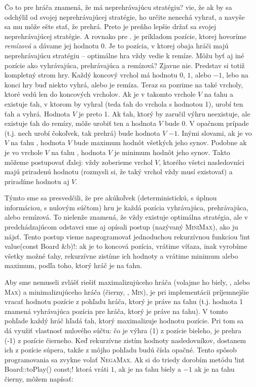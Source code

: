 Čo to pre hráča \crossinl znamená, že \noughtinl má neprehrávajúcu stratégiu?
\crossinl vie, že ak by sa odchýlil od svojej neprehrávajúcej stratégie, \noughtinl 
ho určite nenechá vyhrať, a navyše sa mu môže ešte stať, že prehrá. Preto je preňho lepšie
držať sa svojej neprehrávajúcej stratégie. A rovnako pre \noughtinl. 
je príkladom pozície, ktorej hovoríme {\em remízová} a dávame jej hodnotu 0. Je to pozícia,
v ktorej obaja hráči majú neprehrávajúcu stratégiu -- optimálne hra vždy vedie k remíze.
Môžu byť aj iné pozície ako vyhrávajúca, prehrávajúca a remízová? 
Zjavne nie. Predstav si totiž kompletný strom hry. Každý koncový vrchol má hodnotu $0$, $1$, alebo $-1$,
lebo na konci hry buď niekto vyhrá, alebo je remíza. Teraz sa pozrime na také vrcholy, 
ktoré vedú len do koncových vrcholov. Ak je v takomto vrchole $V$ na ťahu \crossinl a existuje
ťah, v ktorom by vyhral (teda ťah do vrchola s hodnotou 1), \crossinl urobí ten ťah a vyhrá.
Hodnota $V$ je preto 1. Ak ťah, ktorý by \crossinl zaručil výhru neexistuje, ale existuje
ťah do remízy, \crossinl môže urobiť ten a hodnota $V$ bude 0. V opačnom prípade (t.j. nech \crossinl
urobí čokoľvek, tak prehrá) bude hodnota $V$ $-1$. Inými slovami, ak je vo $V$ na ťahu \crossinl,
hodnota $V$ bude maximum hodnôt všetkých jeho synov. Podobne ak je vo vrchole $V$ na ťahu \noughtinl,
hodnota $V$ je minimum hodnôt jeho synov. Takto môžeme postupovať ďalej: vždy zoberieme vrchol $V$,
ktorého všetci nasledovníci majú priradenú hodnotu (rozmysli si, že taký vrchol vždy musí existovať) 
a priradíme hodnotu aj $V$. 

 
Týmto sme sa presvedčili, že pre akúkoľvek (deterministickú, s úplnou informáciou, s nulovým súčtom) 
hru je každá pozícia vyhrávajúca, prehrávajúca, alebo remízová. To nielenže znamená, 
že vždy existuje optimálna
stratégia, ale v predchádzajúcom odstavci sme aj opísali postup (nazývaný {\scshape MiniMax}), ako
ju nájsť. Tento postup vieme naprogramovať jednoduchou rekurzívnou funkciou \prg!int value(const Board &b)!:
ak je to koncová pozícia, vrátime víťaza, inak vyrobíme všetky možné ťahy, rekurzívne zistíme ich hodnoty a
vrátime minimum alebo maximum, podľa toho, ktorý hráč je na ťahu.

Aby sme nemuseli
zvlášť riešiť maximalizujúceho hráča (volajme ho biely, \crossinl, alebo {\scshape Max}) a minimalizujúceho
hráča (čierny, \noughtinl, {\scshape Min}), je pri implementácii príjemnejšie vracať hodnotu pozície z pohľadu hráča, 
ktorý je 
práve na ťahu (t.j. hodnota 1 znamená vyhrávajúca pozícia pre hráča, ktorý je práve na ťahu). 
V tomto pohľade každý hráč hľadá ťah, ktorý maximalizuje hodnotu pozície. 
Pri tom sa dá využiť vlastnosť nulového súčtu: čo je výhra (1) z pozície bieleho, je prehra
(-1) z pozície čierneho. Keď rekurzívne zistím hodnoty nasledovníkov, dostanem ich z pozície súpera, takže 
z môjho pohľadu budú čísla opačné. Tento spôsob programovania sa zvykne volať {\scshape NegaMax}.
Ak si do triedy  dorobím metódu \prg!int Board::toPlay() const;!
ktorá vráti $1$, ak je na ťahu biely a $-1$ ak je na ťahu čierny, môžem napísať:


